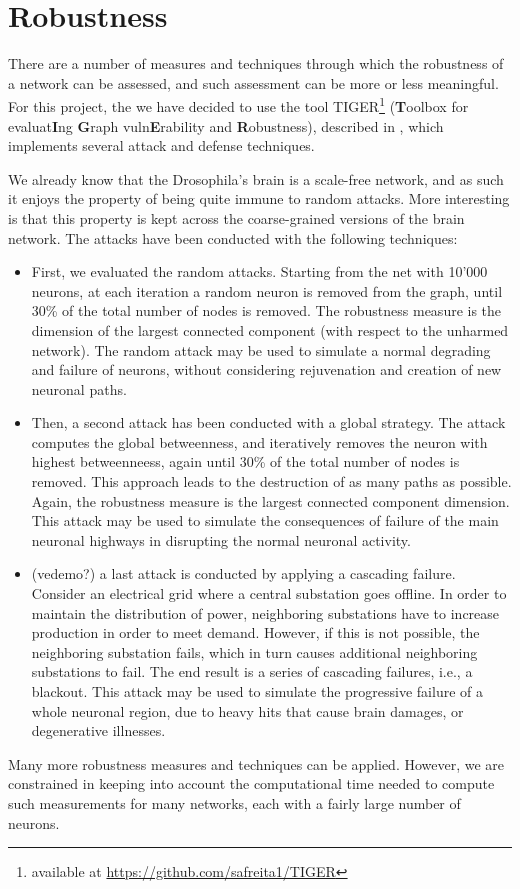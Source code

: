 \section{Robustness}
There are a number of measures and techniques through which the robustness of a network can be assessed, and such assessment can be more or less meaningful. For this project, the we have decided to use the tool TIGER\footnote{available at \href{https://github.com/safreita1/TIGER}{https://github.com/safreita1/TIGER}} (\textbf{T}oolbox for evaluat\textbf{I}ng \textbf{G}raph vuln\textbf{E}rability and \textbf{R}obustness), described in \cite{freitas2020tiger}, which implements several attack and defense techniques.

We already know that the Drosophila's brain is a scale-free network, and as such it enjoys the property of being quite immune to random attacks. More interesting is that this property is kept across the coarse-grained versions of the brain network. The attacks have been conducted with the following techniques:
\begin{itemize}
	\item First, we evaluated the random attacks. Starting from the net with 10'000 neurons, at each iteration a random neuron is removed from the graph, until 30\% of the total number of nodes is removed. The robustness measure is the dimension of the largest connected component (with respect to the unharmed network). \newline The random attack may be used to simulate a normal degrading and failure of neurons, without considering rejuvenation and creation of new neuronal paths. 
	\item Then, a second attack has been conducted with a global strategy. The attack computes the global betweenness, and iteratively removes the neuron with highest betweenneess, again until 30\% of the total number of nodes is removed. This approach leads to the destruction of as many paths as possible. Again, the robustness measure is the largest connected component dimension.
	\newline This attack may be used to simulate the consequences of failure of the main neuronal highways in disrupting the normal neuronal activity.
	\item (vedemo?) a last attack is conducted by applying a cascading failure.  Consider an electrical grid where a central substation goes offline. In order to maintain the distribution of power, neighboring substations have to increase production in order to meet demand. However, if this is not possible, the neighboring substation fails, which in turn causes additional neighboring substations to fail. The end result is a series of cascading failures, i.e., a blackout.  
	\newline This attack may be used to simulate the progressive failure of a whole neuronal region, due to heavy hits that cause brain damages, or degenerative illnesses.
\end{itemize}
Many more robustness measures and techniques can be applied. However, we are constrained in keeping into account the computational time needed to compute such measurements for many networks, each with a fairly large number of neurons.